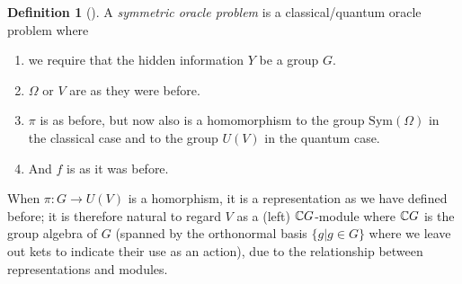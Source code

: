 \documentclass[12pt,twoside]{reedthesis}
\theoremstyle{plain}   %
\theoremstyle{definition}
\newtheorem{defn}{Definition}[section]
\theoremstyle{remark}
\numberwithin{equation}{section}
\def\Sym{\mathrm{Sym}}
\begin{document}
  \begin{defn}[{\cite[Section 2]{copeland}}]
    A \emph{symmetric oracle problem} is a classical/quantum oracle problem where
    \begin{enumerate}
    \item we require that the hidden information $Y$ be a group $G$.
    \item $\Omega$ or $V$ are as they were before.
    \item $\pi$ is as before, but now also is a homomorphism to the group $\Sym(\Omega)$ in the classical case and to the group $U(V)$ in the quantum case.
    \item And $f$ is as it was before.
    \end{enumerate}
    When $\pi: G \to U(V)$ is a homorphism, it is a representation as we have defined before;
    it is therefore natural to regard $V$ as a (left) $\mathbb{C} G$-module where $\mathbb{C} G$ is the group algebra of $G$ (spanned by the orthonormal basis $\{g | g \in G\}$ where we leave out kets to indicate their use as an action),
    due to the relationship between representations and modules.
  \end{defn}
\end{document}

